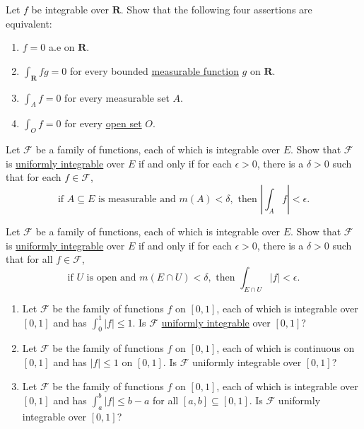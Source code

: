  \begin{exercise}[Royden 4.49]
    Let $f$ be integrable over $\mathbf{R}$. Show that the following four assertions are equivalent:
    \begin{enumerate}
      \item $f = 0$ a.e on $\mathbf{R}$.
      \item $\int_{\mathbf{R}} fg = 0$ for every bounded \hyperref[def:measurable-function]{measurable function} $g$ on $\mathbf{R}$.
      \item $\int_A f = 0$ for every measurable set $A$.
      \item $\int_O f = 0$ for every \hyperref[pst-def:open-set]{open set} $O$.
    \end{enumerate}
  \end{exercise}

  \begin{exercise}[Royden 4.50]
    Let $\mathcal{F}$ be a family of functions, each of which is integrable over $E$. Show that $\mathcal{F}$ is \hyperref[def:uniformly-integrable]{uniformly integrable} over $E$ if and only if for each $\epsilon > 0$, there is a $\delta > 0$ such that for each $f \in \mathcal{F}$,
    \begin{equation*}
      \text{if } A \subseteq E \text{ is measurable and } m(A) < \delta, \text{ then } \left|\int_A f\right| < \epsilon.
    \end{equation*}
  \end{exercise}

  \begin{exercise}[Royden 4.51]
    Let $\mathcal{F}$ be a family of functions, each of which is integrable over $E$. Show that $\mathcal{F}$ is \hyperref[def:uniformly-integrable]{uniformly integrable} over $E$ if and only if for each $\epsilon > 0$, there is a $\delta > 0$ such that for all $f \in \mathcal{F}$,
    \begin{equation*}
      \text{if } U \text{ is open and } m(E \cap U) < \delta, \text{ then } \int_{E \cap U} |f| < \epsilon.
    \end{equation*}
  \end{exercise}

  \begin{exercise}[Royden 4.52]
    \begin{enumerate}
      \item Let $\mathcal{F}$ be the family of functions $f$ on $[0, 1]$, each of which is integrable over $[0, 1]$ and has $\int_0^1 |f| \leq 1$. Is $\mathcal{F}$ \hyperref[def:uniformly-integrable]{uniformly integrable} over $[0, 1]$?
      \item Let $\mathcal{F}$ be the family of functions $f$ on $[0, 1]$, each of which is continuous on $[0, 1]$ and has $|f| \leq 1$ on $[0, 1]$. Is $\mathcal{F}$ uniformly integrable over $[0, 1]$?
      \item Let $\mathcal{F}$ be the family of functions $f$ on $[0, 1]$, each of which is integrable over $[0, 1]$ and has $\int_a^b |f| \leq b - a$ for all $[a, b] \subseteq [0, 1]$. Is $\mathcal{F}$ uniformly integrable over $[0, 1]$?
    \end{enumerate}
  \end{exercise}

